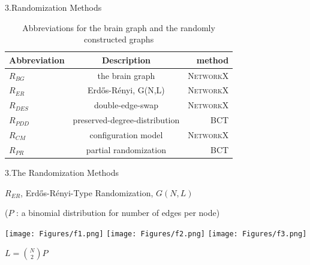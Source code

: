 \documentclass{beamer}
\begin{document}
\begin{frame}{3.Randomization Methods}
	\begin{table}[h]
		\begin{center}
\caption[Abbreviations of Randomization Methods]{Abbreviations for the brain graph and the randomly constructed graphs }
\begin{tabular}{ l | c | r }
  Abbreviation & Description & method \\
  \hline  \hline                     
  $R_{BG}$ & the brain graph               & \textsc{NetworkX}  \\ \hline
  $R_{ER}$ & Erd\H{o}s-R\'{e}nyi, G(N,L)   & \textsc{NetworkX} \\ \hline
  $R_{DES}$ & double-edge-swap             & \textsc{NetworkX} \\ \hline
  $R_{PDD}$ & preserved-degree-distribution& \textsc{BCT} 	 \\ \hline  
  $R_{CM}$ & configuration model       	   & \textsc{NetworkX} \\ \hline
  $R_{PR}$ & partial randomization         & \textsc{BCT} 	 \\ \hline  
  \hline  
\end{tabular}
\label{table:Abbreviations of Randomization Methods}
		\end{center}
	\end{table}	

\end{frame}


\begin{frame}{3.The Randomization Methods}

\footnotesize{$R_{ER}$, Erd\H{o}s-R\'{e}nyi-Type Randomization, $G(N,L)$} 

($P$ : a binomial distribution for number of edges per node) 

	\texttt{[image: Figures/f1.png]}  
	\texttt{[image: Figures/f2.png]} 
    \texttt{[image: Figures/f3.png]}


$ L = \binom {N} {2}P $

\end{frame}
\end{document}

